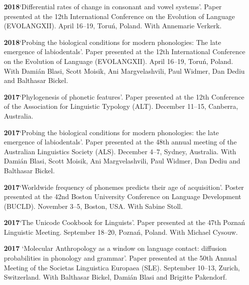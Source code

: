 \documentclass[11pt]{article}
\newcommand{\hangpara}{
 \setlength{\parindent}{0in} %
 \hangindent=0.42in %
}
\begin{document}
\vskip 6pt
\hangpara
{\bf 2018}\hspace{1ex}`Differential rates of change in consonant and vowel systems'. Paper presented at the 12th International Conference on the Evolution of Language (EVOLANGXII). April 16--19, Toru{\'n}, Poland. With Annemarie Verkerk. %

\vskip 6pt
\hangpara
{\bf 2018}\hspace{1ex}`Probing the biological conditions for modern phonologies: The late emergence of labiodentals'. Paper presented at the 12th International Conference on the Evolution of Language (EVOLANGXII). April 16--19, Toru{\'n}, Poland. With Dami{\'a}n Blasi, Scott Moisik, Ani Margvelashvili, Paul Widmer, Dan Dediu and Balthasar Bickel.

\vskip 6pt
\hangpara
{\bf 2017}\hspace{1ex}`Phylogenesis of phonetic features'. Paper presented at the 12th Conference of the Association for Linguistic Typology (ALT). December 11--15, Canberra, Australia.

\vskip 6pt
\hangpara
{\bf 2017}\hspace{1ex}`Probing the biological conditions for modern phonologies: the late emergence of labiodentals'. Paper presented at the 48th annual meeting of the Australian Linguistics Society (ALS). December 4--7, Sydney, Australia. With Dami{\'a}n Blasi, Scott Moisik, Ani Margvelashvili, Paul Widmer, Dan Dediu and Balthasar Bickel.

\vskip 6pt
\hangpara
{\bf 2017}\hspace{1ex}`Worldwide frequency of phonemes predicts their age of acquisition'. Poster presented at the 42nd Boston University Conference on Language Development (BUCLD). November 3--5, Boston, USA. With Sabine Stoll.

\vskip 6pt
\hangpara
{\bf 2017}\hspace{1ex}`The Unicode Cookbook for Linguists'. Paper presented at the 47th Pozna{\'n} Linguistic Meeting. September 18--20, Pozna{\'n}, Poland. With Michael Cysouw. 

\vskip 6pt
\hangpara
{\bf 2017}\hspace{1ex} `Molecular Anthropology as a window on language contact: diffusion probabilities in phonology and grammar'. Paper presented at the 50th Annual Meeting of the Societas Linguistica Europaea (SLE). September 10--13, Zurich, Switzerland. With Balthasar Bickel, Dami{\'a}n Blasi and Brigitte Pakendorf.
 
\end{document}

